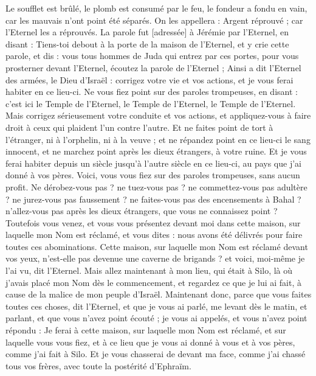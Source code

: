 \begin{multicols}{2}
Le soufflet est brûlé, le plomb est consumé par le feu, le fondeur a fondu en vain, car les mauvais n'ont point été séparés.
On les appellera : Argent réprouvé ; car l'Eternel les a réprouvés.
\VerseOne{}La parole fut [adressée] à Jérémie par l'Eternel, en disant :
Tiens-toi debout à la porte de la maison de l'Eternel, et y crie cette parole, et dis : vous tous hommes de Juda qui entrez par ces portes, pour vous prosterner devant l'Eternel, écoutez la parole de l'Eternel ;
Ainsi a dit l'Eternel des armées, le Dieu d'Israël : corrigez votre vie et vos actions, et je vous ferai habiter en ce lieu-ci.
Ne vous fiez point sur des paroles trompeuses, en disant : c'est ici le Temple de l'Eternel, le Temple de l'Eternel, le Temple de l'Eternel.
Mais corrigez sérieusement votre conduite et vos actions, et appliquez-vous à faire droit à ceux qui plaident l'un contre l'autre.
Et ne faites point de tort à l'étranger, ni à l'orphelin, ni à la veuve ; et ne répandez point en ce lieu-ci le sang innocent, et ne marchez point après les dieux étrangers, à votre ruine.
Et je vous ferai habiter depuis un siècle jusqu’à l'autre siècle en ce lieu-ci, au pays que j'ai donné à vos pères.
Voici, vous vous fiez sur des paroles trompeuses, sans aucun profit.
Ne dérobez-vous pas ? ne tuez-vous pas ? ne commettez-vous pas adultère ? ne jurez-vous pas faussement ? ne faites-vous pas des encensements à Bahal ? n'allez-vous pas après les dieux étrangers, que vous ne connaissez point ?
Toutefois vous venez, et vous vous présentez devant moi dans cette maison, sur laquelle mon Nom est réclamé, et vous dites : nous avons été délivrés pour faire toutes ces abominations.
Cette maison, sur laquelle mon Nom est réclamé devant vos yeux, n'est-elle pas devenue une caverne de brigands ? et voici, moi-même je l'ai vu, dit l'Eternel.
Mais allez maintenant à mon lieu, qui était à Silo, là où j'avais placé mon Nom dès le commencement, et regardez ce que je lui ai fait, à cause de la malice de mon peuple d'Israël.
Maintenant donc, parce que vous faites toutes ces choses, dit l'Eternel, et que je vous ai parlé, me levant dès le matin, et parlant, et que vous n'avez point écouté ; je vous ai appelés, et vous n'avez point répondu :
Je ferai à cette maison, sur laquelle mon Nom est réclamé, et sur laquelle vous vous fiez, et à ce lieu que je vous ai donné à vous et à vos pères, comme j'ai fait à Silo.
Et je vous chasserai de devant ma face, comme j'ai chassé tous vos frères, avec toute la postérité d'Ephraïm.

\end{multicols}
